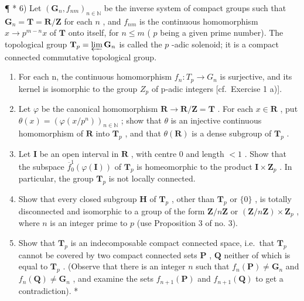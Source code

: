 ¶ * 6) Let \((\mathbf{G}_n, f_{nm})_{n \in \mathbb{N}}\) be the inverse system of compact groups such that \(\mathbf{G}_n = \mathbf{T} = \mathbf{R} / \mathbf{Z}\) for each \(n\) , and \(f_{nm}\) is the continuous homomorphism \(x \to p^{m-n}x\) of \(\mathbf{T}\) onto itself, for \(n \leqslant m\) ( \(p\) being a given prime number). The topological group \(\mathbf{T}_p = \varprojlim \mathbf{G}_n\) is called the \(p\) -adic solenoid; it is a compact connected commutative topological group.

\begin{enumerate}
\def\labelenumi{\alph{enumi})}
\item
  For each n, the continuous homomorphism \(f_{n}: T_{p} \to G_{n}\) is surjective, and its kernel is isomorphic to the group \(Z_{p}\) of p-adic integers {[}cf.~Exercise 1 a){]}.
\item
  Let \(\varphi\) be the canonical homomorphism \(\mathbf{R} \to \mathbf{R} / \mathbf{Z} = \mathbf{T}\) . For each \(x \in \mathbf{R}\) , put \(\theta(x) = (\varphi(x / p^n))_{n \in \mathbb{N}}\) ; show that \(\theta\) is an injective continuous homomorphism of \(\mathbf{R}\) into \(\mathbf{T}_p\) , and that \(\theta(\mathbf{R})\) is a dense subgroup of \(\mathbf{T}_p\) .
\item
  Let \(\mathbf{I}\) be an open interval in \(\mathbf{R}\) , with centre \(0\) and length \(< 1\) . Show that the subspace \(\overline{f}_{0}^{1}(\varphi(\mathbf{I}))\) of \(\mathbf{T}_p\) is homeomorphic to the product \(\mathbf{I} \times \mathbf{Z}_p\) . In particular, the group \(\mathbf{T}_p\) is not locally connected.
\item
  Show that every closed subgroup \(\mathbf{H}\) of \(\mathbf{T}_p\) , other than \(\mathbf{T}_p\) or \(\{0\}\) , is totally disconnected and isomorphic to a group of the form \(\mathbf{Z}/n\mathbf{Z}\) or \((\mathbf{Z}/n\mathbf{Z}) \times \mathbf{Z}_p\) , where \(n\) is an integer prime to \(p\) (use Proposition 3 of no. 3).
\item
  Show that \(\mathbf{T}_p\) is an indecomposable compact connected space, i.e.~that \(\mathbf{T}_p\) cannot be covered by two compact connected sets \(\mathbf{P}\) , \(\mathbf{Q}\) neither of which is equal to \(\mathbf{T}_p\) . (Observe that there is an integer \(n\) such that \(f_n(\mathbf{P}) \neq \mathbf{G}_n\) and \(f_n(\mathbf{Q}) \neq \mathbf{G}_n\) , and examine the sets \(f_{n+1}(\mathbf{P})\) and \(f_{n+1}(\mathbf{Q})\) to get a contradiction). *
\end{enumerate}

